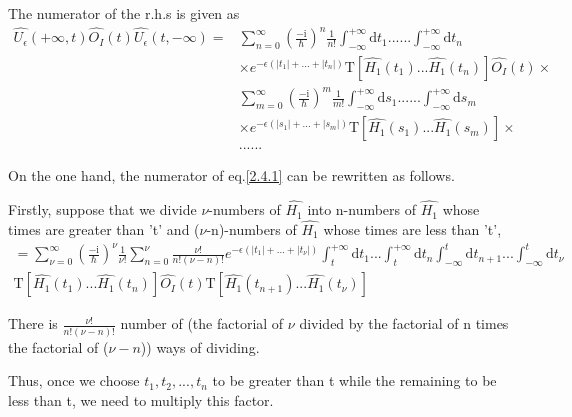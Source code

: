 The numerator  of the r.h.s is given as
\begin{align}
\hat{U_{\epsilon}}(+\infty,t)\hat{O_I}(t)\hat{U_{\epsilon}}(t,-\infty)=&\sum_{n=0}^{\infty}(\frac{-\mathrm{i}}{\hbar})^{n} \frac{1}{n!} \int_{-\infty}^{+\infty}\mathrm{d}t_1......\int_{-\infty}^{+\infty}\mathrm{d}t_{n} \nonumber \\
& \times e^{-\epsilon(|t_1|+...+|t_{n}|)}\mathrm{T}[\hat{H_1}(t_1)...\hat{H_1}(t_{n})]\hat{O_I}(t)\times \nonumber \\
& \sum_{m=0}^{\infty}(\frac{-\mathrm{i}}{\hbar})^{m} \frac{1}{m!} \int_{-\infty}^{+\infty}\mathrm{d}s_1......\int_{-\infty}^{+\infty}\mathrm{d}s_{m} \nonumber \\
& \times e^{-\epsilon(|s_1|+...+|s_{m}|)}\mathrm{T}[\hat{H_1}(s_1)...\hat{H_1}(s_{m})]\times \nonumber \\
& ...... \nonumber
\end{align}

On the one hand, the numerator of eq.\eqref{2.4.1} can be rewritten as follows.

Firstly, suppose that we divide  $\nu$-numbers of $\hat{H_1}$ into n-numbers of $\hat{H_1}$ whose times are greater than 't' and ($\nu$-n)-numbers of $\hat{H_1}$ whose times are less than 't',
\begin{align}
=\sum_{\nu=0}^{\infty}(\frac{-\mathrm{i}}{\hbar})^{\nu} \frac{1}{\nu!} \sum_{n=0}^{\nu}\frac{\nu!}{n!(\nu-n)!}e^{-\epsilon(|t_1|+...+|t_{\nu}|)} \int_{t}^{+\infty}\mathrm{d}t_1...\int_{t}^{+\infty}\mathrm{d}t_{n} 
\int_{-\infty}^{t}\mathrm{d}t_{n+1}...\int_{-\infty}^{t}\mathrm{d}t_{\nu} \nonumber \\
\mathrm{T}[\hat{H_1}(t_1)...\hat{H_1}(t_{n})]\hat{O_I}(t)\mathrm{T}[\hat{H_1}(t_{n+1})...\hat{H_1}(t_{\nu})] \nonumber
\end{align}

There is $\frac{\nu!}{n!(\nu-n)!}$ number of (the factorial of $\nu$ divided by the factorial of n times the factorial of ($\nu-n$)) ways of dividing.

Thus, once we choose $t_1,t_2,...,t_n$ to be greater than t while the  remaining to be less than t, we need to multiply this factor.

